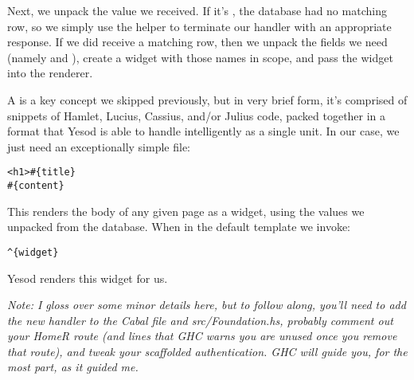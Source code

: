 Next, we unpack the  value we received. If it's , the database had no matching row, so we simply use the  helper to terminate our handler with an appropriate response. If we did receive a matching row, then we unpack the fields we need (namely  and ), create a widget with those names in scope, and pass the widget into the  renderer.

A  is a key concept we skipped previously, but in very brief form, it's comprised of snippets of Hamlet, Lucius, Cassius, and/or Julius code, packed together in a format that Yesod is able to handle intelligently as a single unit. In our case, we just need an exceptionally simple  file:

\begin{Verbatim}
<h1>#{title}
#{content}
\end{Verbatim}

This renders the body of any given page as a widget, using the values we unpacked from the database. When in the default template we invoke:

\begin{Verbatim}
^{widget}
\end{Verbatim}

Yesod renders this widget for us.

\emph{Note: I gloss over some minor details here, but to follow along, you'll need to add the new handler to the Cabal file and src/Foundation.hs, probably comment out your HomeR route (and lines that GHC warns you are unused once you remove that route), and tweak your scaffolded authentication. GHC will guide you, for the most part, as it guided me.}


